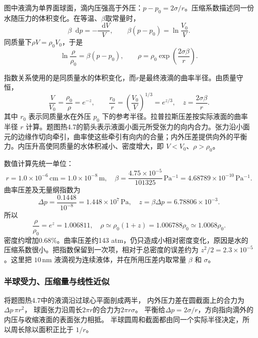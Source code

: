 \documentclass[UTF8,fontset=fandol,a4paper,11pt]{ctexart}
\newcommand{\dd}{\mathop{}\!\mathrm{d}}
\newcommand{\result}[1]{\boxed{#1}}
\newcommand{\figcaption}[1]{\par\vspace{2pt}{\small\color{muted}#1}\par}
\begin{document}
图中液滴为单界面球面，滴内压强高于外压：$p-p_0=2\sigma/r$。压缩系数描述同一份水随压力的体积变化。在等温、$\beta$取常量时，
\[
\beta\dd p=-\frac{\dd V}{V},\qquad
\beta(p-p_0)=\ln\frac{V_0}{V}.
\]
同质量下$\rho V=\rho_0V_0$，于是
\[
\ln\frac{\rho}{\rho_0}=\beta(p-p_0),\qquad
\result{\rho=\rho_0\exp\left(\frac{2\sigma\beta}{r}\right)}.
\]
\begin{center}\begin{minipage}{0.96\linewidth}\centering{}\figcaption{解图 热4.7A　先积分压缩系数，再用小指数作近似。}\end{minipage}\end{center}
指数关系使用的是同质量水的体积变化，而$r$是最终液滴的曲率半径。由质量守恒，
\[\frac{V}{V_0}=\frac{\rho_0}{\rho}=e^{-z},\qquad
\frac{r_0}{r}=\left(\frac{V_0}{V}\right)^{1/3}=e^{z/3},\quad
z=\frac{2\sigma\beta}{r}.\]
其中 $r_0$ 表示同质量水在外压 $p_0$ 下的参考半径。拉普拉斯压差按实际液面的曲率半径 $r$ 计算。题图热4.7的箭头表示液面小面元所受张力的向内合力。张力沿小面元的边缘作切向牵引，曲率使这些牵引有向内的合量；内外压差提供向外的平衡力。内压升高使同质量的水体积减小、密度增大，即 $V<V_0$、$\rho>\rho_0$。

数值计算先统一单位：
\[
r=1.0\times10^{-6}\,\mathrm{cm}=1.0\times10^{-8}\,\mathrm m,
\quad \beta=\frac{4.75\times10^{-5}}{101325}\,\mathrm{Pa^{-1}}
=4.68789\times10^{-10}\,\mathrm{Pa^{-1}}.
\]
曲率压差及无量纲指数为
\[
\Delta p=\frac{0.1448}{10^{-8}}=1.448\times10^7\,\mathrm{Pa},
\quad z=\beta\Delta p=6.78806\times10^{-3}.
\]
所以
\[
\frac{\rho}{\rho_0}=e^z=1.006811,
\quad \rho\simeq\rho_0(1+z)=1.006788\rho_0\simeq1.0068\rho_0.
\]
密度约增加0.68\%。曲率压差约143 atm，仍只造成小相对密度变化，原因是水的压缩系数很小。把指数保留到一次项，相对于总密度的误差约为 $z^2/2=2.3\times10^{-5}$。这里把 $10\,\mathrm{nm}$ 液滴视为连续液体，并在所用压差内取常量 $\beta$ 和 $\sigma$。
\subsubsection*{半球受力、压缩量与线性近似}
将题图热4.7中的液滴沿过球心平面剖成两半，
内外压力差在圆截面上的合力为$\Delta p\,\pi r^2$，
球面张力沿周长$2\pi r$的合力为$2\pi r\sigma$。
平衡给$\Delta p=2\sigma/r$，方向指向滴外的内压与收缩液面的表面张力相抵。
半球圆周和截面都由同一个实际半径决定，所以周长除以面积正比于 $1/r$。
\end{document}
